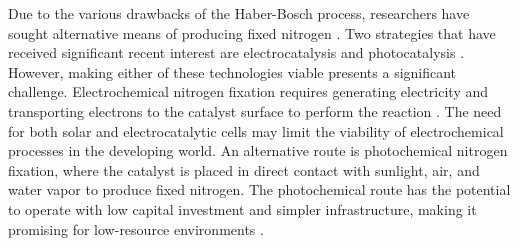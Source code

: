 Due to the various drawbacks of the Haber-Bosch process, researchers have sought alternative means of producing fixed nitrogen \cite{Comer_2019, McPherson_2019, WANG20181055, Kyriakou_2017, de_Bruijn_2015, Michalsky_2015}. 
Two strategies that have received significant recent interest are electrocatalysis \cite{McPherson_2019} and photocatalysis \cite{Medford_2017}. However, making either of these technologies viable presents a significant challenge. Electrochemical nitrogen fixation requires generating electricity and transporting electrons to the catalyst surface to perform the reaction \cite{Kyriakou_2017}. The need for both solar and electrocatalytic cells may limit the viability of electrochemical processes in the developing world. An alternative route is photochemical nitrogen fixation, where the catalyst is placed in direct contact with sunlight, air, and water vapor  to produce fixed nitrogen. The photochemical route has the potential to operate with low capital investment and simpler infrastructure, making it promising for low-resource environments \cite{Comer_2019}. 

